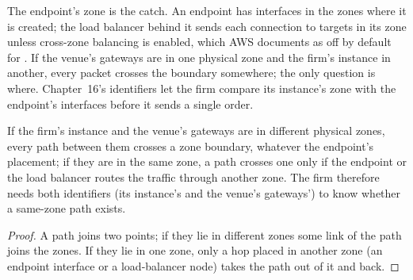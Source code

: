 The endpoint's zone is the catch. An endpoint has interfaces in the zones where it is created; the load
balancer behind it sends each connection to targets in its zone unless cross-zone balancing is enabled, which AWS documents as off by default
for . If the venue's gateways are in one physical zone and the firm's instance in another, every packet crosses the
boundary somewhere; the only question is where. Chapter~16's identifiers let the firm compare its instance's zone with the endpoint's
interfaces before it sends a single order.

\begin{proposition}\label{prop:nw:private-connectivity-to-crypto-venues:zone}
If the firm's instance and the venue's gateways are in different physical zones, every path between them crosses a zone boundary, whatever the
endpoint's placement; if they are in the same zone, a path crosses one only if the endpoint or the load balancer routes the traffic through
another zone. The firm therefore needs both identifiers (its instance's and the venue's gateways') to know whether a same-zone path exists.
\end{proposition}

\begin{proof}
A path joins two points; if they lie in different zones some link of the path joins the zones. If they lie in one zone, only a hop placed in
another zone (an endpoint interface or a load-balancer node) takes the path out of it and back.
\end{proof}

\begin{omfigure}

\label{fig:nw:private-connectivity-to-crypto-venues:zones}
\end{omfigure}

